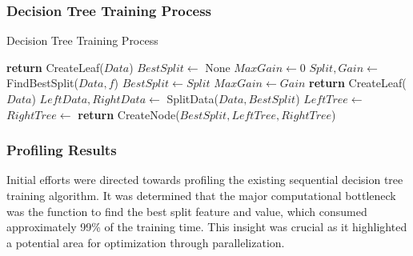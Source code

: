 \documentclass[11.5pt]{article}
\begin{document}
\subsubsection{Decision Tree Training Process}
\begin{algorithm}
    \caption{Decision Tree Training Process}\label{alg:decisiontree}
    \begin{algorithmic}[1]
            \State \textbf{return} CreateLeaf($Data$)
        \EndIf
        \State $BestSplit \gets$ None
        \State $MaxGain \gets 0$
            \State \color{red} $Split, Gain \gets$ FindBestSplit($Data, f$) \color{black} %
                \State $BestSplit \gets Split$
                \State $MaxGain \gets Gain$
            \EndIf
        \EndFor
            \State \textbf{return} CreateLeaf($Data$)
        \EndIf
        \State $LeftData, RightData \gets$ SplitData($Data, BestSplit$)
        \State $LeftTree \gets$ 
        \State $RightTree \gets$ 
        \State \textbf{return} CreateNode($BestSplit, LeftTree, RightTree$)
    \EndProcedure
    \end{algorithmic}
\end{algorithm}

\subsubsection{Profiling Results}
Initial efforts were directed towards profiling the existing sequential decision tree training algorithm. It was determined that the major computational bottleneck was the function to find the best split feature and value, which consumed approximately 99\% of the training time. This insight was crucial as it highlighted a potential area for optimization through parallelization.
\end{document}
